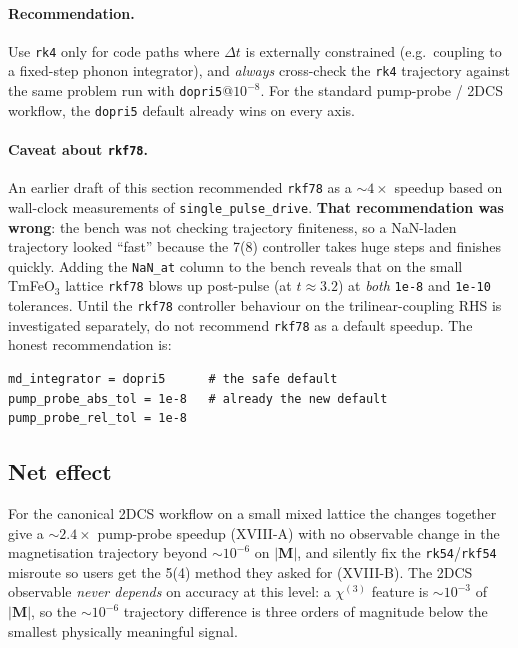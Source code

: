 \documentclass[11pt,letterpaper]{article}
\begin{document}
\paragraph{Recommendation.}  Use \texttt{rk4} only for code paths
where $\Delta t$ is externally constrained (e.g.\ coupling to a
fixed-step phonon integrator), and \emph{always} cross-check the
\texttt{rk4} trajectory against the same problem run with
\texttt{dopri5}@$10^{-8}$.  For the standard pump-probe / 2DCS
workflow, the \texttt{dopri5} default already wins on every axis.

\paragraph{Caveat about \texttt{rkf78}.}  An earlier draft of this
section recommended \texttt{rkf78} as a $\sim 4\times$ speedup
based on wall-clock measurements of \texttt{single\_pulse\_drive}.
\textbf{That recommendation was wrong}: the bench was not checking
trajectory finiteness, so a NaN-laden trajectory looked ``fast''
because the 7(8) controller takes huge steps and finishes quickly.
Adding the \texttt{NaN\_at} column to the bench reveals that on
the small TmFeO$_3$ lattice \texttt{rkf78} blows up post-pulse
(at $t \approx 3.2$) at \emph{both} \texttt{1e-8} and
\texttt{1e-10} tolerances.  Until the \texttt{rkf78} controller
behaviour on the trilinear-coupling RHS is investigated separately,
do not recommend \texttt{rkf78} as a default speedup.  The honest
recommendation is:
\begin{verbatim}
md_integrator = dopri5      # the safe default
pump_probe_abs_tol = 1e-8   # already the new default
pump_probe_rel_tol = 1e-8
\end{verbatim}

\subsection*{Net effect}

For the canonical 2DCS workflow on a small mixed lattice the
changes together give a $\sim 2.4\times$ pump-probe speedup
(XVIII-A) with no observable change in the magnetisation trajectory
beyond $\sim 10^{-6}$ on $|\mathbf{M}|$, and silently fix the
\texttt{rk54}/\texttt{rkf54} misroute so users get the 5(4) method
they asked for (XVIII-B).  The 2DCS observable \emph{never depends}
on accuracy at this level: a $\chi^{(3)}$ feature is $\sim 10^{-3}$
of $|\mathbf{M}|$, so the $\sim 10^{-6}$ trajectory difference is
three orders of magnitude below the smallest physically meaningful
signal.
\end{document}
